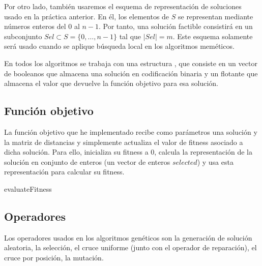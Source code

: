 \documentclass[10pt,a4paper]{article}
\begin{document}
Por otro lado, también usaremos el esquema de representación de soluciones usado en la práctica anterior. En él, los elementos de $S$ se representan mediante números enteros del $0$ al $n-1$. Por tanto, una solución factible consistirá en un subconjunto $Sel \subset S = \{0,\dots,n-1\}$ tal que $|Sel| = m$. Este esquema solamente será usado cuando se aplique búsqueda local en los algoritmos meméticos.

En todos los algoritmos se trabaja con una estructura , que consiste en un vector de booleanos  que almacena una solución en codificación binaria y un flotante  que almacena el valor que devuelve la función objetivo para esa solución.

\subsection{Función objetivo}

La función objetivo que he implementado recibe como parámetros una solución y la matriz de distancias y simplemente actualiza el valor de fitness asociado a dicha solución. Para ello, inicializa su fitness a 0, calcula la representación de la solución en conjunto de enteros (un vector de enteros $selected$) y usa esta representación para calcular su fitness.\\

\begin{algorithm}[H]
	\caption{evaluateFitness}
\end{algorithm}



\subsection{Operadores}

Los operadores usados en los algoritmos genéticos son la generación de solución aleatoria, la selección, el cruce uniforme (junto con el operador de reparación), el cruce por posición, la mutación.
\end{document}
